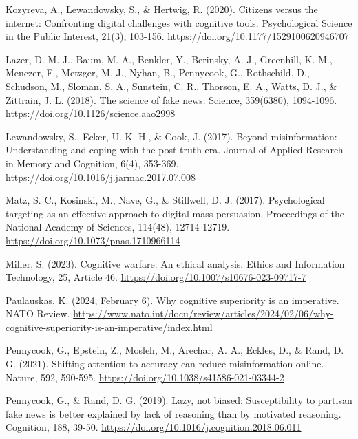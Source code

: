 \documentclass[11pt]{article}
\begin{document}
\noindent Kozyreva, A., Lewandowsky, S., \& Hertwig, R. (2020). Citizens versus the internet: Confronting digital challenges with cognitive tools. Psychological Science in the Public Interest, 21(3), 103-156. \url{https://doi.org/10.1177/1529100620946707}\par

\noindent Lazer, D. M. J., Baum, M. A., Benkler, Y., Berinsky, A. J., Greenhill, K. M., Menczer, F., Metzger, M. J., Nyhan, B., Pennycook, G., Rothschild, D., Schudson, M., Sloman, S. A., Sunstein, C. R., Thorson, E. A., Watts, D. J., \& Zittrain, J. L. (2018). The science of fake news. Science, 359(6380), 1094-1096. \url{https://doi.org/10.1126/science.aao2998}\par

\noindent Lewandowsky, S., Ecker, U. K. H., \& Cook, J. (2017). Beyond misinformation: Understanding and coping with the post-truth era. Journal of Applied Research in Memory and Cognition, 6(4), 353-369. \url{https://doi.org/10.1016/j.jarmac.2017.07.008}\par

\noindent Matz, S. C., Kosinski, M., Nave, G., \& Stillwell, D. J. (2017). Psychological targeting as an effective approach to digital mass persuasion. Proceedings of the National Academy of Sciences, 114(48), 12714-12719. \url{https://doi.org/10.1073/pnas.1710966114}\par

\noindent Miller, S. (2023). Cognitive warfare: An ethical analysis. Ethics and Information Technology, 25, Article 46. \url{https://doi.org/10.1007/s10676-023-09717-7}\par

\noindent Paulauskas, K. (2024, February 6). Why cognitive superiority is an imperative. NATO Review. \url{https://www.nato.int/docu/review/articles/2024/02/06/why-cognitive-superiority-is-an-imperative/index.html}\par

\noindent Pennycook, G., Epstein, Z., Mosleh, M., Arechar, A. A., Eckles, D., \& Rand, D. G. (2021). Shifting attention to accuracy can reduce misinformation online. Nature, 592, 590-595. \url{https://doi.org/10.1038/s41586-021-03344-2}\par

\noindent Pennycook, G., \& Rand, D. G. (2019). Lazy, not biased: Susceptibility to partisan fake news is better explained by lack of reasoning than by motivated reasoning. Cognition, 188, 39-50. \url{https://doi.org/10.1016/j.cognition.2018.06.011}\par
\end{document}
